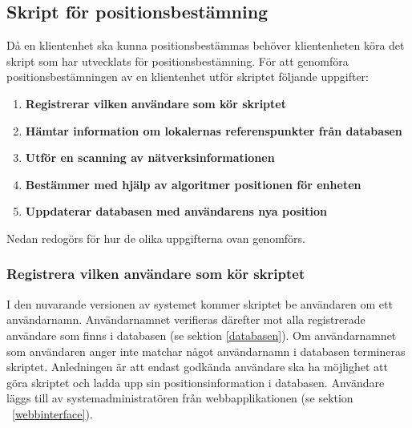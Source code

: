 \documentclass[a4paper,12pt]{article}
\begin{document}
 \subsection{Skript för positionsbestämning}
 Då en klientenhet ska kunna positionsbestämmas behöver klientenheten köra det skript som har utvecklats för positionsbestämning. För att genomföra positionsbestämningen av en klientenhet utför skriptet följande uppgifter:
 \begin{enumerate}
   \item \textbf{Registrerar vilken användare som kör skriptet}
   \item \textbf{Hämtar information om lokalernas referenspunkter från databasen}
   \item \textbf{Utför en scanning av nätverksinformationen}
   \item \textbf{Bestämmer med hjälp av algoritmer positionen för enheten}
   \item \textbf{Uppdaterar databasen med användarens nya position}
 \end{enumerate}

 Nedan redogörs för hur de olika uppgifterna ovan genomförs.

 \subsubsection{Registrera vilken användare som kör skriptet}
 I den nuvarande versionen av systemet kommer skriptet be användaren om ett användarnamn. Användarnamnet verifieras därefter mot alla registrerade användare som finns i databasen (se sektion \ref{databasen}). Om användarnamnet som användaren anger inte matchar något användarnamn i databasen termineras skriptet. Anledningen är att endast godkända användare ska ha möjlighet att göra skriptet och ladda upp sin positionsinformation i databasen. Användare läggs till av systemadministratören från webbapplikationen (se sektion ~\ref{webbinterface}).
\end{document}
